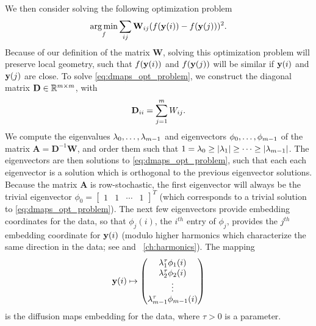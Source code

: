 We then consider solving the following optimization problem \citep{Belkin2003}
\begin{equation} \label{eq:dmaps_opt_problem}
\operatorname*{arg\,min}_{f} \sum_{ij} \mathbf{W}_{ij} (f(\mathbf{y}(i)) - f(\mathbf{y}(j)))^2.
\end{equation}
%
Because of our definition of the matrix $\mathbf{W}$, solving this optimization problem will preserve local geometry, such that $f(\mathbf{y}(i))$ and $f(\mathbf{y}(j))$ will be similar if $\mathbf{y}(i)$ and $\mathbf{y}(j)$ are close. 
%
To solve \eqref{eq:dmaps_opt_problem}, we construct the diagonal matrix $\mathbf{D} \in \mathbb{R}^{m \times m}$, with
\begin{equation}
\mathbf{D}_{ii} = \sum_{j=1}^m W_{ij}.
\end{equation}
%
We compute the eigenvalues $\lambda_0, \dots, \lambda_{m-1}$ and eigenvectors $\phi_0, \dots, \phi_{m-1}$ of the matrix $\mathbf{A} = \mathbf{D}^{-1}\mathbf{W}$, and order them such that $1 = \lambda_0 \ge |\lambda_1| \ge \dots \ge |\lambda_{m-1}|$.
%
The eigenvectors are then solutions to \eqref{eq:dmaps_opt_problem}, such that each each eigenvector is a solution which is orthogonal to the previous eigenvector solutions. 
%
Because the matrix $\mathbf{A}$ is row-stochastic, the first eigenvector will always be the trivial eigenvector $\phi_0 = \begin{bmatrix} 1 & 1 & \cdots & 1 \end{bmatrix}^T$ (which corresponds to a trivial solution to \eqref{eq:dmaps_opt_problem}).
%
The next few eigenvectors provide embedding coordinates for the data, so that $\phi_j(i)$, the $i^{th}$ entry of $\phi_j$, provides the $j^{th}$ embedding coordinate for $\mathbf{y}(i)$ (modulo higher harmonics which characterize
the same direction in the data; see \cite{ferguson2010systematic} and \chap~\ref{ch:harmonics}).
%
The mapping
\begin{equation} \label{eq:dmaps_embed_full}
\mathbf{y}(i) \mapsto 
\begin{pmatrix}
\lambda_1^\tau \phi_1(i) \\
\lambda_2^\tau \phi_2(i) \\
\vdots \\
\lambda_{m-1}^\tau  \phi_{m-1}(i)
\end{pmatrix}
\end{equation}
is the diffusion maps embedding for the data, where $\tau > 0$ is a parameter.

